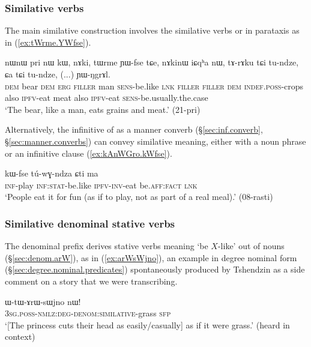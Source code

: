 \subsubsection{Similative verbs} \label{sec:svc.deixis}

The main similative construction involves the similative verbs  or  in parataxis as in (\ref{ex:tWrme.YWfse}).

\begin{exe}
\ex \label{ex:tWrme.YWfse}
\gll nɯnɯ pri nɯ kɯ, nɤki, tɯrme ɲɯ-fse tɕe, nɤkinɯ iɕqʰa nɯ, tɤ-rɤku tɕi tu-ndze, ɕa tɕi tu-ndze, (...)  ɲɯ-ŋgrɤl. \\
\textsc{dem} bear \textsc{dem} \textsc{erg} \textsc{filler} man \textsc{sens}-be.like \textsc{lnk} \textsc{filler} \textsc{filler} \textsc{dem} \textsc{indef}.\textsc{poss}-crops also \textsc{ipfv}-eat meat also \textsc{ipfv}-eat { } \textsc{sens}-be.usually.the.case \\
\glt `The bear, like a man, eats grains and meat.' (21-pri)
\end{exe}

Alternatively, the infinitive  of  as a manner converb (§\ref{sec:inf.converb}, §\ref{sec:manner.converbs}) can convey similative meaning, either with a noun phrase or an infinitive clause (\ref{ex:kAnWGro.kWfse}).

\begin{exe}
\ex \label{ex:kAnWGro.kWfse}
\gll [kɤ-ɤnɯɣro] kɯ-fse tú-wɣ-ndza ɕti ma \\
\textsc{inf}-play \textsc{inf}:\textsc{stat}-be.like \textsc{ipfv}-\textsc{inv}-eat be.\textsc{aff}:\textsc{fact} \textsc{lnk} \\
\glt `People eat it for fun (as if to play, not as part of a real meal).' (08-rasti)
\end{exe}


\subsubsection{Similative denominal stative verbs} \label{sec:denominal:similative}
The denominal prefix  derives stative verbs meaning `be $X$-like' out of nouns (§\ref{sec:denom.arW}), as in (\ref{ex:arWsWjno}), an example in degree nominal form (§\ref{sec:degree.nominal.predicates}) spontaneously produced by Tshendzin as a side comment on a story that we were transcribing.

\begin{exe}
	\ex \label{ex:arWsWjno}
	\gll  ɯ-tɯ-ɤrɯ-sɯjno nɯ!   \\
	\textsc{3sg}.\textsc{poss}-\textsc{nmlz}:\textsc{deg}-\textsc{denom}:\textsc{similative}-grass \textsc{sfp} \\
	\glt `[The princess cuts their head as easily/casually] as if it were grass.' (heard in context)
\end{exe}

